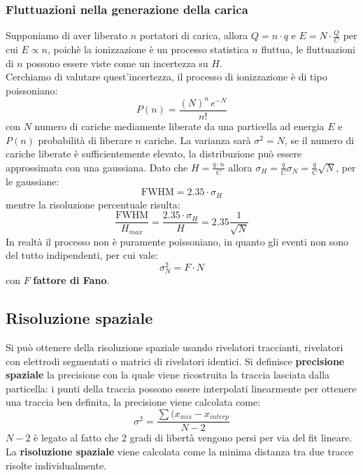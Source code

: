 \subsubsection{Fluttuazioni nella generazione della carica}
Supponiamo di aver liberato $n$ portatori di carica, allora $Q = n \cdot q$ e $E = N \cdot \frac{Q}{C}$ per cui $E \propto n$,
poich\`e la ionizzazione \`e un processo statistica $n$ fluttua, le fluttuazioni di $n$ possono essere viste come un incertezza su $H$.\\
Cerchiamo di valutare quest'incertezza, il processo di ionizzazione \`e di tipo poissoniano:
\begin{equation}
P(n) = \frac{(N)^n \, e^{-N}}{n!}
\end{equation}
con $N$ numero di cariche mediamente liberate da una particella ad energia $E$ e $P(n)$ probabilit\`a di liberare $n$ cariche.
La varianza sar\`a $\sigma^2 = N$, se il numero di cariche liberate \`e sufficientemente elevato, la distribuzione pu\`o essere approssimata con una gaussiana.
Dato che $H = \frac{q \cdot n}{C}$ allora $\sigma_H = \frac{q}{C} \sigma_N = \frac{q}{C} \sqrt{N}$, per le gaussiane:
\begin{equation*}
\text{FWHM} = 2.35 \cdot \sigma_H 
\end{equation*}
mentre la risoluzione percentuale risulta:
\begin{equation*}
\frac{\text{FWHM}}{H_{max}} = \frac{2.35 \cdot \sigma_H}{H} = 2.35 \frac{1}{\sqrt{N}}
\end{equation*}
In realt\`a il processo non \`e puramente poissoniano, in quanto gli eventi non sono del tutto indipendenti, per cui vale:
\begin{equation*}
\sigma_{N}^2 = F \cdot N
\end{equation*}
con $F$ \textbf{fattore di Fano}.
\subsection{Risoluzione spaziale}
Si pu\`o ottenere della risoluzione spaziale usando rivelatori traccianti, rivelatori con elettrodi segmentati o matrici di rivelatori identici.
Si definisce \textbf{precisione spaziale} la precisione con la quale viene ricostruita la traccia lasciata dalla particella:
i punti della traccia possono essere interpolati linearmente per ottenere una traccia ben definita, la precisione viene calcolata come:
\begin{equation*}
\sigma^2 = \frac{\sum (x_{mis} - x_{interp}}{N-2}
\end{equation*}
$N-2$ \`e legato al fatto che 2 gradi di libert\`a vengono persi per via del fit lineare.\\
La \textbf{risoluzione spaziale} viene calcolata come la minima distanza tra due tracce risolte individualmente.
